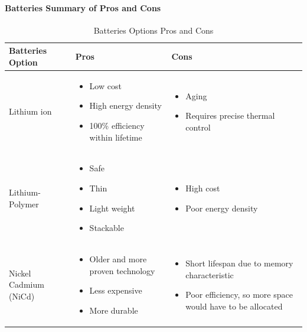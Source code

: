 \documentclass[3p]{elsarticle}
\begin{document}
\paragraph{Batteries Summary of Pros and Cons}
\begin{table}[H]
\centering
\begin{tabular}{|p{}|p{}|p{}|} 
\hline
\textbf{Batteries Option} & \textbf{Pros} & \textbf{Cons}
\\
\hline
     Lithium ion
     &
    \begin{itemize}
        \item Low cost
        \item High energy density
        \item 100\% efficiency within lifetime
    \end{itemize}
    &
    \begin{itemize}
        \item Aging
        \item Requires precise thermal control
    \end{itemize}
    \\
\hline
     Lithium-Polymer
     &
    \begin{itemize}
        \item Safe
        \item Thin
        \item Light weight
        \item Stackable
    \end{itemize}
    &
    \begin{itemize}
        \item High cost
        \item Poor energy density
    \end{itemize}
    \\
\hline
    Nickel Cadmium (NiCd)
    &
    \begin{itemize}
        \item Older and more proven technology
        \item Less expensive
        \item More durable
    \end{itemize}
    &
    \begin{itemize}
        \item Short lifespan due to memory characteristic
        \item Poor efficiency, so more space would have to be allocated
    \end{itemize}
    \\
\hline
\end{tabular}
\caption{Batteries Options Pros and Cons}
\label{tbl:Batteries_ProCon}
\end{table}
\end{document}
